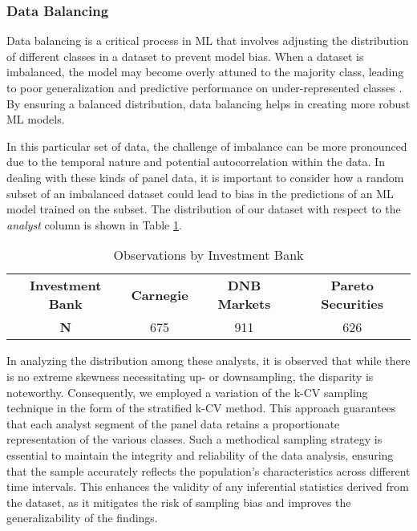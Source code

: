 \subsubsection{Data Balancing}
Data balancing is a critical process in ML that involves adjusting the distribution of different classes in a dataset to prevent model bias. When a dataset is imbalanced, the model may become overly attuned to the majority class, leading to poor generalization and predictive performance on under-represented classes \parencite{app12083928}. By ensuring a balanced distribution, data balancing helps in creating more robust ML models.

In this particular set of data, the challenge of imbalance can be more pronounced due to the temporal nature and potential autocorrelation within the data. In dealing with these kinds of panel data, it is important to consider how a random subset of an imbalanced dataset could lead to bias in the predictions of an ML model trained on the subset. The distribution of our dataset with respect to the \textit{analyst} column is shown in Table \ref{tab:analystcount}. 


\begin{table}[ht]
    \centering
    \small %
    \begin{tabular*}{\textwidth}{@{\extracolsep{\fill}}cccc@{}}
        \toprule
        \textbf{Investment Bank }
        & \textbf{Carnegie} & \textbf{DNB Markets} & \textbf{Pareto Securities} \\
        \textbf{N} & 675 & 911 & 626 \\
        \bottomrule
    \end{tabular*}
    \caption{Observations by Investment Bank}
    \label{tab:analystcount}
\end{table}
In analyzing the distribution among these analysts, it is observed that while there is no extreme skewness necessitating up- or downsampling, the disparity is noteworthy. Consequently, we employed a variation of the k-CV sampling technique in the form of the stratified k-CV method. This approach guarantees that each analyst segment of the panel data retains a proportionate representation of the various classes. Such a methodical sampling strategy is essential to maintain the integrity and reliability of the data analysis, ensuring that the sample accurately reflects the population's characteristics across different time intervals. This enhances the validity of any inferential statistics derived from the dataset, as it mitigates the risk of sampling bias and improves the generalizability of the findings.

